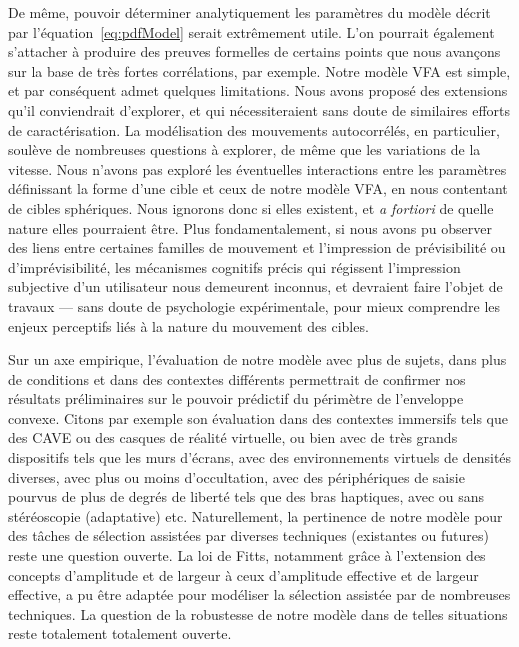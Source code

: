 	De même, pouvoir déterminer analytiquement les paramètres du modèle décrit par l'équation~\ref{eq:pdfModel} serait extrêmement utile. L'on pourrait également s'attacher à produire des preuves formelles de certains points que nous avançons sur la base de très fortes corrélations, par exemple. Notre modèle VFA est simple, et par conséquent admet quelques limitations. Nous avons proposé des extensions qu'il conviendrait d'explorer, et qui nécessiteraient sans doute de similaires efforts de caractérisation. La modélisation des mouvements autocorrélés, en particulier, soulève de nombreuses questions à explorer, de même que les variations de la vitesse. Nous n'avons pas exploré les éventuelles interactions entre les paramètres définissant la forme d'une cible et ceux de notre modèle VFA, en nous contentant de cibles sphériques. Nous ignorons donc si elles existent, et \emph{a fortiori} de quelle nature elles pourraient être. Plus fondamentalement, si nous avons pu observer des liens entre certaines familles de mouvement et l'impression de prévisibilité ou d'imprévisibilité, les mécanismes cognitifs précis qui régissent l'impression subjective d'un utilisateur nous demeurent inconnus, et devraient faire l'objet de travaux --- sans doute de psychologie expérimentale, pour mieux comprendre les enjeux perceptifs liés à la nature du mouvement des cibles.
	
	Sur un axe empirique, l'évaluation de notre modèle avec plus de sujets, dans plus de conditions et dans des contextes différents permettrait de confirmer nos résultats préliminaires sur le pouvoir prédictif du périmètre de l'enveloppe convexe. Citons par exemple son évaluation dans des contextes immersifs tels que des CAVE ou des casques de réalité virtuelle, ou bien avec de très grands dispositifs tels que les murs d'écrans, avec des environnements virtuels de densités diverses, avec plus ou moins d'occultation, avec des périphériques de saisie pourvus de plus de degrés de liberté tels que des bras haptiques, avec ou sans stéréoscopie (adaptative) etc. Naturellement, la pertinence de notre modèle pour des tâches de sélection assistées par diverses techniques (existantes ou futures) reste une question ouverte. La loi de Fitts, notamment grâce à l'extension des concepts d'amplitude et de largeur à ceux d'amplitude effective et de largeur effective, a pu être adaptée pour modéliser la sélection assistée par de nombreuses techniques. La question de la robustesse de notre modèle dans de telles situations reste totalement totalement ouverte.
	
